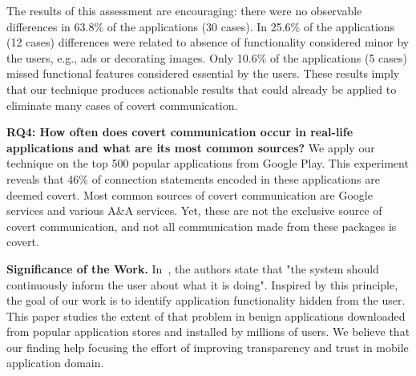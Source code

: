 The results of this  assessment are encouraging: there were no observable differences in 63.8\% of the applications (30 cases). In 25.6\% of the applications (12 cases) differences were related to absence of functionality considered minor by the users, e.g., ads or decorating images. Only 10.6\% of the applications (5 cases) missed functional features considered essential by the users. 
These results imply that our technique produces actionable results that could already be applied to eliminate many cases of covert communication. 


\noindent 
{\bf RQ4: How often does covert communication occur in real-life applications and what are its most common sources?}
We apply our technique on the top 500 popular applications from Google Play. This experiment reveals that 46\% of connection statements encoded in these applications 
are deemed covert.
Most common sources of covert communication are Google services %
and various A\&A services. Yet, these are not the exclusive source of covert communication, and not all communication made from these packages is covert. 

%

\noindent 
{\bf Significance of the Work.}  
In~\cite{Nielsen:Molich:CHI90,Blackmon:Polson:Kitajima:Lewis:CHI02,Ko:Zhang:CHI11}, the authors state that  
"the system should continuously inform the user about what it is doing".
Inspired by this principle, the goal of our work is to identify 
application functionality hidden from the user.
This paper studies the extent of that problem in benign
applications downloaded from popular application stores
and installed by millions of users.
We believe that our finding help focusing the effort of improving
transparency and trust in mobile application domain. 


